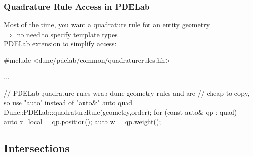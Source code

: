 \documentclass[aspectratio=169,11pt]{beamer}
\theoremstyle{definition}
\newcommand{\diffd}{\,d}
\begin{document}
\begin{frame}[fragile]
  \frametitle{Quadrature Rule Access in PDELab}

  Most of the time, you want a quadrature rule for an entity geometry\\[.5em]
  $\Longrightarrow$ no need to specify template types\\[1em]

  PDELab extension to simplify access:
\begin{cppcode}
#include <dune/pdelab/common/quadraturerules.hh>

...

// PDELab quadrature rules wrap dune-geometry rules and are
// cheap to copy, so use "auto" instead of "auto&"
auto quad = Dune::PDELab::quadratureRule(geometry,order);
for (const auto& qp : quad)
{
    auto x_local = qp.position();
    auto w = qp.weight();
}
\end{cppcode}

\end{frame}


\subsection{Intersections}
\end{document}
